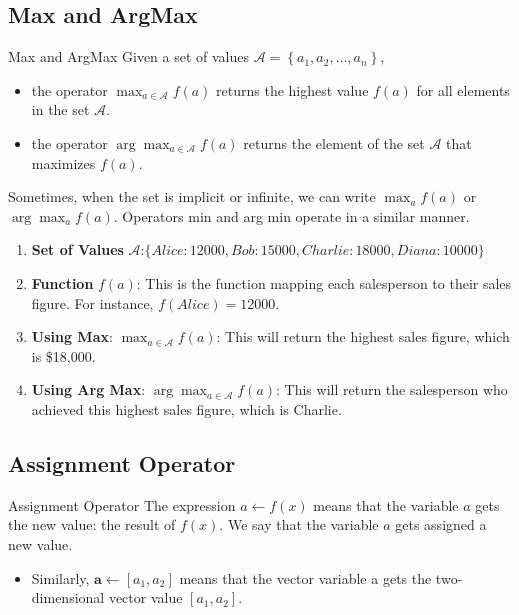 \documentclass[9pt,dvipsnames]{beamer}
\begin{document}
\subsection{Max and ArgMax}

\begin{frame}{Max and ArgMax}
	Given a set of values $\mathcal{A}=\left\{a_{1}, a_{2}, \ldots, a_{n}\right\}$,

	\begin{itemize}
		\item the operator $\max _{a \in \mathcal{A}} f(a)$ returns the highest value $f(a)$ for all elements in the set $\mathcal{A}$.
		\item the operator $\arg \max _{a \in \mathcal{A}} f(a)$ returns the element of the set $\mathcal{A}$ that maximizes $f(a)$.
	\end{itemize}
	Sometimes, when the set is implicit or infinite, we can write $\max _{a} f(a)$ or $\arg \max _{a} f(a)$. Operators min and arg min operate in a similar manner.

	\begin{tcolorbox}[enhanced jigsaw, breakable, pad at break*=1mm, colback=gray!20!white, colframe=black!85!black, title=\textbf{Example}]
		\begin{enumerate}
			\item \textbf{Set of Values} $\mathcal{A}$:$ \{ Alice: 12000, Bob: 15000, Charlie: 18000, Diana: 10000 \}$
			\item \textbf{Function} $f(a)$: This is the function mapping each salesperson to their sales figure. For instance, $f(Alice) = 12000$.
			\item \textbf{Using Max}: $\max_{a \in \mathcal{A}} f(a)$: This will return the highest sales figure, which is \$18,000.
			\item \textbf{Using Arg Max}: $\arg \max_{a \in \mathcal{A}} f(a)$: This will return the salesperson who achieved this highest sales figure, which is Charlie.
		\end{enumerate}
	\end{tcolorbox}
\end{frame}

\subsection{Assignment Operator}
\begin{frame}{Assignment Operator}
	The expression $a \leftarrow f(x)$ means that the variable $a$ gets the new value: the result of $f(x)$. We say that the variable $a$ gets assigned a new value.
	\begin{itemize}
		\item Similarly, $\mathbf{a} \leftarrow\left[a_{1}, a_{2}\right]$ means that the vector variable a gets the two-dimensional vector value $\left[a_{1}, a_{2}\right]$.
	\end{itemize}
\end{frame}
\end{document}
